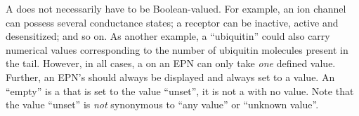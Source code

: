 A  does not necessarily have to be Boolean-valued.  For example, an ion channel can possess several conductance states; a receptor can be inactive, active and desensitized; and so on.  As another example, a  ``ubiquitin'' could also carry numerical values corresponding to the number of ubiquitin molecules present in the tail.  However, in all cases, a  on an EPN can only take \emph{one} defined value.  Further, an EPN's  should always be displayed and always set to a value.  An ``empty''  is a  that is set to the value ``unset'', it is not a  with no value. Note that the value ``unset'' is \emph{not} synonymous to ``any value'' or ``unknown value''.



